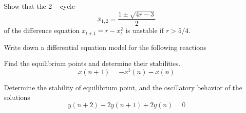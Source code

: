 \documentclass[12pt]{exam}
\begin{document}
\begin{questions}
\question[6]
Show that the $2-$cycle
$$\bar x_{1,2}=\frac{1\pm \sqrt{4r-3}}{2}$$
of the difference equation $x_{t+1}=r-x_t^2$ is unstable if $r> 5/4$.


\question[8]
Write down a differential equation model for the following reactions



\question[10]
Find the equilibrium points and determine their stabilities.
$$x(n+1)=-x^3(n)-x(n)$$


\question[10]
Determine the stability of equilibrium point, and the oscillatory behavior of the solutions
$$y(n+2)-2y(n+1)+2y(n)=0$$


\end{questions}
\end{document}
